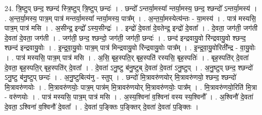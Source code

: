 \documentclass[17pt]{extarticle}
\begin{document}
24. त्रि॒ष्टुप् छन्द॒ श्छन्द॑ स्त्रि॒ष्टुप् त्रि॒ष्टुप् छन्दः॑ । . छन्दो᳚ ऽन्तर्या॒मस्या᳚ न्तर्या॒मस्य॒ छन्द॒ श्छन्दो᳚ ऽन्तर्या॒मस्य॑ । . अ॒न्त॒र्या॒मस्य॒ पात्र॒म् पात्र॑ मन्तर्या॒मस्या᳚ न्तर्या॒मस्य॒ पात्र᳚म् । . अ॒न्त॒र्या॒मस्येत्य॑न्तः - या॒मस्य॑ । . पात्र॑ मस्यसि॒ पात्र॒म् पात्र॑ मसि । . अ॒सीन्द्र॒ इन्द्रो᳚ ऽस्य॒सीन्द्रः॑ । . इन्द्रो॑ दे॒वता॑ दे॒वतेन्द्र॒ इन्द्रो॑ दे॒वता᳚ । . दे॒वता॒ जग॑ती॒ जग॑ती दे॒वता॑ दे॒वता॒ जग॑ती । . जग॑ती॒ छन्द॒ श्छन्दो॒ जग॑ती॒ जग॑ती॒ छन्दः॑ । . छन्द॑ इन्द्रवायु॒वो रि॑न्द्रवायु॒वो श्छन्द॒ श्छन्द॑ इन्द्रवायु॒वोः । . इ॒न्द्र॒वा॒यु॒वोः पात्र॒म् पात्र॑ मिन्द्रवायु॒वो रि॑न्द्रवायु॒वोः पात्र᳚म् । . इ॒न्द्र॒वा॒यु॒वोरिती᳚न्द्र - वा॒यु॒वोः । . पात्र॑ मस्यसि॒ पात्र॒म् पात्र॑ मसि । . अ॒सि॒ बृह॒स्पति॒र् बृह॒स्पति॑ रस्यसि॒ बृह॒स्पतिः॑ । . बृह॒स्पति॑र् दे॒वता॑ दे॒वता॒ बृह॒स्पति॒र् बृह॒स्पति॑र् दे॒वता᳚ । . दे॒वता॑ ऽनु॒ष्टु ब॑नु॒ष्टुब् दे॒वता॑ दे॒वता॑ ऽनु॒ष्टुप् । . अ॒नु॒ष्टुप् छन्द॒ श्छन्दो॑ ऽनु॒ष्टु ब॑नु॒ष्टुप् छन्दः॑ । . अ॒नु॒ष्टुबित्य॑नु - स्तुप् । . छन्दो॑ मि॒त्रावरु॑णयोर् मि॒त्रावरु॑णयो॒ श्छन्द॒ श्छन्दो॑ मि॒त्रावरु॑णयोः । . मि॒त्रावरु॑णयोः॒ पात्र॒म् पात्र॑म् मि॒त्रावरु॑णयोर् मि॒त्रावरु॑णयोः॒ पात्र᳚म् । . मि॒त्रावरु॑णयो॒रिति॑ मि॒त्रा - वरु॑णयोः । . पात्र॑ मस्यसि॒ पात्र॒म् पात्र॑ मसि । . अ॒स्य॒श्विना॑ व॒श्विना॑ वस्य स्य॒श्विनौ᳚ । . अ॒श्विनौ॑ दे॒वता॑ दे॒वता॒ ऽश्विना॑ व॒श्विनौ॑ दे॒वता᳚ । . दे॒वता॑ प॒ङ्क्तिः प॒ङ्क्तिर् दे॒वता॑ दे॒वता॑ प॒ङ्क्तिः । \newline
\end{document}
